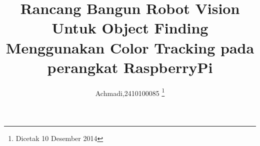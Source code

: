 \documentclass[10pt,journal,compsoc]{IEEEtran}
\begin{document}
 \title{Rancang Bangun Robot Vision Untuk Object Finding Menggunakan Color Tracking pada perangkat RaspberryPi}

 \author{
  Achmadi,2410100085
 \thanks{Dicetak 10 Desember 2014}
 }
 
 
%   
%   
  
  \maketitle
  
  \IEEEdisplaynontitleabstractindextext
  \IEEEpeerreviewmaketitle
 
\end{document}
